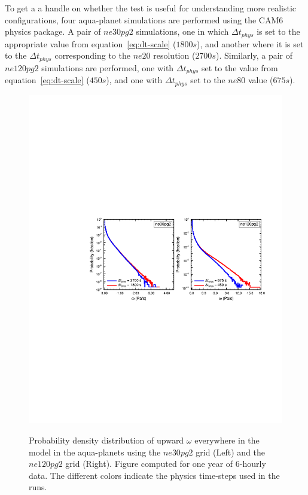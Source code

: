 \documentclass{agujournal}
\begin{document}
To get a a handle on whether the test is useful for understanding more realistic configurations, four aqua-planet simulations are performed using the CAM6 physics package. A pair of $ne30pg2$ simulations, one in which $\Delta t_{phys}$ is set to the appropriate value from equation~\eqref{eq:dt-scale} ($1800s$), and another where it is set to the $\Delta t_{phys}$ corresponding to the $ne20$ resolution ($2700s$). Similarly, a pair of $ne120pg2$ simulations are performed, one with $\Delta t_{phys}$ set to the value from equation~\eqref{eq:dt-scale} ($450s$), and one with $\Delta t_{phys}$ set to the $ne80$ value ($675s$). 

\begin{figure}[t]
\begin{center}
\noindent\includegraphics[width=30pc,angle=0]{panel_pdf_dtphys.pdf}\\
\end{center}
\caption{Probability density distribution of upward $\omega$ everywhere in the model in the aqua-planets using the $ne30pg2$ grid (Left) and the $ne120pg2$ grid (Right). Figure computed for one year of 6-hourly data. The different colors indicate the physics time-steps used in the runs.}
\label{fig:pdf-dtphys}
\end{figure}
\end{document}

